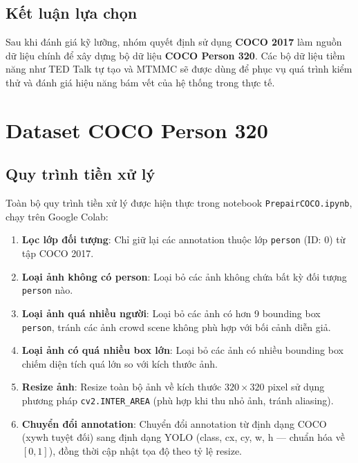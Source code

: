 \subsection{Kết luận lựa chọn}

Sau khi đánh giá kỹ lưỡng, nhóm quyết định sử dụng \textbf{COCO 2017} làm nguồn dữ liệu chính để xây dựng bộ dữ liệu \textbf{COCO Person 320}. Các bộ dữ liệu tiềm năng như TED Talk tự tạo và MTMMC sẽ được dùng để phục vụ quá trình kiểm thử và đánh giá hiệu năng bám vết của hệ thống trong thực tế.

\section{Dataset COCO Person 320}
\label{sec:ds_coco_person}

\subsection{Quy trình tiền xử lý}

Toàn bộ quy trình tiền xử lý được hiện thực trong notebook \texttt{PrepairCOCO.ipynb}, chạy trên Google Colab:

\begin{enumerate}[label=\textbf{Bước \arabic*:}]
    \item \textbf{Lọc lớp đối tượng}: Chỉ giữ lại các annotation thuộc lớp \texttt{person} (ID: 0) từ tập COCO 2017.
    
    \item \textbf{Loại ảnh không có person}: Loại bỏ các ảnh không chứa bất kỳ đối tượng \texttt{person} nào.
    
    \item \textbf{Loại ảnh quá nhiều người}: Loại bỏ các ảnh có hơn 9 bounding box \texttt{person}, tránh các ảnh crowd scene không phù hợp với bối cảnh diễn giả.
    
    \item \textbf{Loại ảnh có quá nhiều box lớn}: Loại bỏ các ảnh có nhiều bounding box chiếm diện tích quá lớn so với kích thước ảnh.
    
    \item \textbf{Resize ảnh}: Resize toàn bộ ảnh về kích thước $320 \times 320$ pixel sử dụng phương pháp \texttt{cv2.INTER\_AREA} (phù hợp khi thu nhỏ ảnh, tránh aliasing).
    
    \item \textbf{Chuyển đổi annotation}: Chuyển đổi annotation từ định dạng COCO (xywh tuyệt đối) sang định dạng YOLO (class, cx, cy, w, h --- chuẩn hóa về $[0, 1]$), đồng thời cập nhật tọa độ theo tỷ lệ resize.
\end{enumerate}

